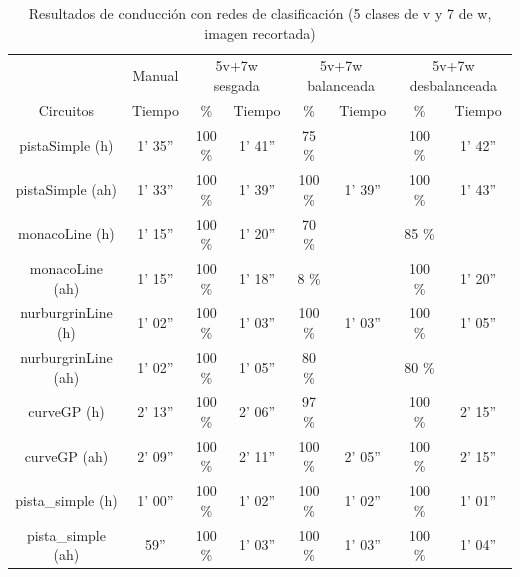 \begin{table}[H]
\centering
\caption{Resultados de conducción con redes de clasificación (5 clases de v y 7 de w, imagen recortada)}
\label{resultados_classificacion_recortada_5v_7w}
\begin{tabular}{c|c|c|c|c|c|c|c|}
\cline{2-8}
                          & \multicolumn{1}{c|}{Manual} & \multicolumn{2}{c|}{5v+7w sesgada} & \multicolumn{2}{c|}{5v+7w balanceada} & \multicolumn{2}{c|}{5v+7w desbalanceada} \\ \cline{1-8} 
                        \multicolumn{1}{|c|}{Circuitos}    & Tiempo       & \%       & Tiempo       & \%        & Tiempo       & \%      & Tiempo     \\ \hline
\multicolumn{1}{|c|}{pistaSimple (h)}    & 1' 35''           & 100 \%         & 1' 41''           & 75 \%          &            & 100 \%       & 1' 42''      \\ \hline
\multicolumn{1}{|c|}{pistaSimple (ah)}     & 1' 33''           & 100 \%          & 1' 39''            & 100 \%           & 1' 39''           & 100 \%       & 1' 43''       \\ \hline
\multicolumn{1}{|c|}{monacoLine (h)}      & 1' 15''           & 100 \%           & 1' 20''            & 70 \%       &             & 85 \%       &           \\ \hline
\multicolumn{1}{|c|}{monacoLine (ah)}       & 1' 15''            & 100 \%       & 1' 18''            & 8 \%           &             & 100 \%          & 1' 20''       \\ \hline
\multicolumn{1}{|c|}{nurburgrinLine (h)}      & 1' 02''            & 100 \%          & 1' 03''            & 100 \%        & 1' 03''            & 100 \%       & 1' 05''      \\ \hline
\multicolumn{1}{|c|}{nurburgrinLine (ah)}       & 1' 02''           & 100 \%           & 1' 05''           & 80 \%        &            & 80 \%       &       \\ \hline
\multicolumn{1}{|c|}{curveGP (h)}     & 2' 13''           & 100 \%           & 2' 06''            & 97 \%        &            & 100 \%       & 2' 15''      \\ \hline
\multicolumn{1}{|c|}{curveGP (ah)}       & 2' 09''            & 100 \%         & 2' 11''            & 100 \%        & 2' 05''           & 100 \%      & 2' 15''     \\ \hline
\multicolumn{1}{|c|}{pista\_simple (h)}       & 1' 00''           & 100 \%          & 1' 02''            & 100 \%        & 1' 02''             & 100 \%      & 1' 01''       \\ \hline
\multicolumn{1}{|c|}{pista\_simple (ah)}     & 59''            & 100 \%          & 1' 03''          & 100 \%        & 1' 03''             & 100 \%      & 1' 04''        \\ \hline
\end{tabular}
\end{table}


